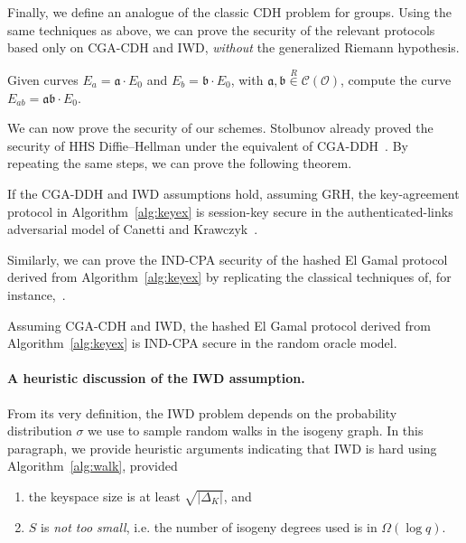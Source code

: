 \documentclass{llncs}
\newcommand{\Cl}{\mathcal{C}}
\renewcommand{\O}{\mathcal{O}}
\renewcommand{\frak}{\mathfrak}
\newcommand{\rand}[1]{\overset{#1}{∈}}
\newcommand{\uni}{\rand{R}}
\begin{document}
Finally, we define an analogue of the classic CDH problem for groups.
Using the same techniques as above, we can prove the
security of the relevant protocols based only on CGA-CDH and IWD,
\emph{without} the generalized Riemann hypothesis.

\begin{definition}
  Given curves $E_a=\frak a·E_0$ and $E_b=\frak b·E_0$, with
  $\frak a,\frak b\uni\Cl(\O)$, compute the curve
  $E_{ab}=\frak{ab}·E_0$.
\end{definition}

We can now prove the security of our schemes. Stolbunov already proved
the security of HHS Diffie--Hellman under the equivalent of CGA-DDH~\cite{Stol}.
By repeating the same steps, we can prove the following theorem.

\begin{theorem}
  If the CGA-DDH and IWD assumptions hold, assuming GRH, the
  key-agreement protocol in Algorithm~\ref{alg:keyex} is session-key
  secure in the authenticated-links adversarial model of Canetti and
  Krawczyk~\cite{canetti}.
\end{theorem}

Similarly, we can prove the IND-CPA security of the hashed El Gamal
protocol derived from Algorithm~\ref{alg:keyex} by replicating the
classical techniques of, for
instance,~\cite[20.4.11]{galbraith2012mathematics}.

\begin{theorem}
  Assuming CGA-CDH and IWD, the hashed El Gamal protocol derived from
  Algorithm~\ref{alg:keyex} is IND-CPA secure in the random oracle
  model.
\end{theorem}


\paragraph{A heuristic discussion of the IWD assumption.}

From its very definition, the IWD problem depends on
the probability distribution $σ$ we use to sample
random walks in the isogeny graph. In this paragraph,
we provide heuristic arguments indicating that IWD is hard
using Algorithm~\ref{alg:walk}, provided 
\begin{enumerate}
    \item the keyspace size is at least $\sqrt{|Δ_K|}$, and
    \item $S$ is \emph{not too small}, i.e. the number of
        isogeny degrees used is in $\Omega(\log q)$.
\end{enumerate}
\end{document}
